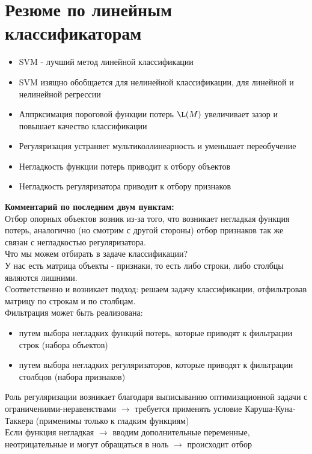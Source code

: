 \section{Резюме по линейным классификаторам}
\begin{itemize}
    \item SVM - лучший метод линейной классификации
    \item SVM изящно обобщается для нелинейной классификации, для линейной и нелинейной регрессии
    \item Аппрксимация пороговой функции потерь $\L (M)$ увеличивает зазор и повышает качество классификации
    \item Регуляризация устраняет мультиколлинеарность и уменьшает переобучение
    \item Негладкость функции потерь приводит к отбору объектов
    \item Негладкость регуляризатора приводит к отбору признаков
\end{itemize}
\textbf{Комментарий по последним двум пунктам:} \\
Отбор опорных объектов возник из-за того, что возникает негладкая функция потерь, аналогично (но смотрим с другой стороны)  отбор признаков так же связан с негладкостью регуляризатора. \\
Что мы можем отбирать в задаче классификации? \\
У нас есть матрица объекты - признаки, то есть либо строки, либо столбцы являются лишними.\\ Cоответственно и возникает подход: решаем задачу классификации, отфильтровав матрицу по строкам и по столбцам. \\
Фильтрация может быть реализована:
\begin{itemize}
    \item путем выбора негладких функций потерь, которые приводят к фильтрации строк (набора объектов)
    \item путем выбора негладких регуляризаторов, которые приводят к фильтрации столбцов (набора признаков)
\end{itemize}
Роль регуляризации возникает благодаря выписыванию оптимизационной задачи с ограничениями-неравенствами $\rightarrow$ требуется применять условие Каруша-Куна-Таккера (применимы только к гладким функциям) \\
Если функция негладкая $\rightarrow$ вводим дополнительные переменные, неотрицательные и могут обращаться в ноль $\rightarrow$ происходит отбор \\



